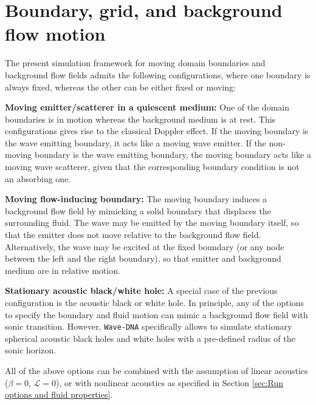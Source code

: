 \section{Boundary, grid, and background flow motion}
\label{sec:Boundary, grid, and background flow motion}

The present simulation framework for moving domain boundaries and background flow fields admits the following configurations, where one boundary is always fixed, whereas the other can be either fixed or moving:
\begin{compactitem}
\item \textbf{Moving emitter/scatterer in a quiescent medium:} One of the domain boundaries is in motion whereas the background medium is at rest. This configurations gives rise to the classical Doppler effect. If the moving boundary is the wave emitting boundary, it acts like a moving wave emitter. If the non-moving boundary is the wave emitting boundary, the moving boundary acts like a moving wave scatterer, given that the corresponding boundary condition is not an absorbing one.
\item \textbf{Moving flow-inducing boundary:} The moving boundary induces a background flow field by mimicking a solid boundary that displaces the surrounding fluid. The wave may be emitted by the moving boundary itself, so that the emitter does not move relative to the background flow field. Alternatively, the wave may be excited at the fixed boundary (or any node between the left and the right boundary), so that emitter and background medium are in relative motion.
\item \textbf{Stationary acoustic black/white hole:} A special case of the previous configuration is the acoustic black or white hole. In principle, any of the options to specify the boundary and fluid motion can mimic a background flow field with sonic transition. However, {\tt Wave-DNA} specifically allows to simulate stationary spherical acoustic black holes and white holes with a pre-defined radius of the sonic horizon.
\end{compactitem} 
All of the above options can be combined with the assumption of linear acoustics ($\beta=0$, $\mathcal{L}=0$), or with nonlinear acoustics as specified in Section \ref{sec:Run options and fluid properties}.


